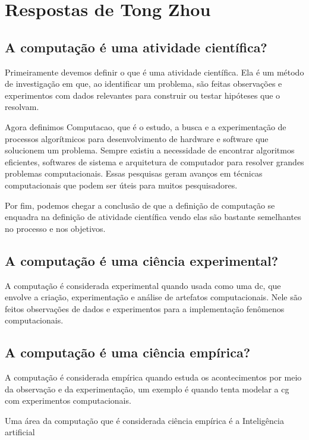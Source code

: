 \section{Respostas de Tong Zhou}

\subsection{A computação é uma atividade científica?}

Primeiramente devemos definir o que é uma atividade científica. Ela é um método de investigação em que, ao identificar um problema, são feitas observações e experimentos com dados relevantes para construir ou testar hipóteses que o resolvam.

Agora definimos \gls{Computacao}, que é o estudo, a busca e a experimentação de processos algorítmicos para desenvolvimento de hardware e software que solucionem um problema. Sempre existiu a necessidade de encontrar algoritmos eficientes, softwares de sistema e arquitetura de computador para resolver grandes problemas computacionais. Essas pesquisas geram avanços em técnicas computacionais que podem ser úteis para muitos pesquisadores.
   
Por fim, podemos chegar a conclusão de que a definição de computação se enquadra na definição de atividade científica vendo elas são bastante semelhantes no processo e nos objetivos. 

\subsection{A computação é uma ciência experimental?}

A computação é considerada experimental quando usada como uma \gls{dc}, que envolve a criação, experimentação e análise de artefatos computacionais. Nele são feitos observações de dados e  experimentos para a implementação fenômenos computacionais.


\subsection{A computação é uma ciência empírica?}

A computação é considerada empírica quando estuda os acontecimentos por meio da observação e da experimentação, um exemplo é quando tenta modelar a \gls{cg} com experimentos computacionais. 

Uma área da computação que é considerada ciência empírica é a Inteligência artificial

